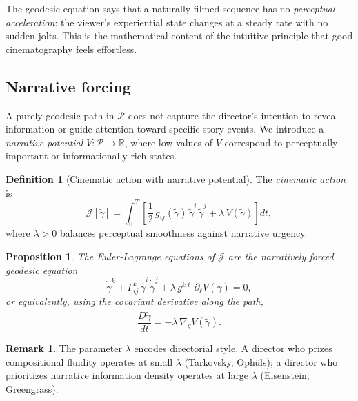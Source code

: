 \documentclass[12pt,a4paper]{article}
\theoremstyle{plain}
\newtheorem{proposition}[theorem]{Proposition}
\theoremstyle{definition}
\newtheorem{definition}[theorem]{Definition}
\newtheorem{remark}[theorem]{Remark}
\begin{document}
The geodesic equation says that a naturally filmed sequence has no
\emph{perceptual acceleration}: the viewer's experiential state changes at
a steady rate with no sudden jolts. This is the mathematical content of the
intuitive principle that good cinematography feels effortless.

\subsection{Narrative forcing}

A purely geodesic path in $\mathcal{P}$ does not capture the director's
intention to reveal information or guide attention toward specific story events.
We introduce a \emph{narrative potential} $V:\mathcal{P}\to\mathbb{R}$, where
low values of $V$ correspond to perceptually important or informationally rich
states.

\begin{definition}[Cinematic action with narrative potential]
The \emph{cinematic action} is
\[
\mathcal{J}[\tilde\gamma]
= \int_0^T
\!\left[
\frac{1}{2}\,g_{ij}(\tilde\gamma)\,\dot{\tilde\gamma}^i\,\dot{\tilde\gamma}^j
+ \lambda\,V(\tilde\gamma)
\right]dt,
\]
where $\lambda > 0$ balances perceptual smoothness against narrative urgency.
\end{definition}

\begin{proposition}
The Euler-Lagrange equations of $\mathcal{J}$ are the \emph{narratively forced
geodesic equation}
\[
\ddot{\tilde\gamma}^k
+ \Gamma^k_{ij}\,\dot{\tilde\gamma}^i\,\dot{\tilde\gamma}^j
+ \lambda\,g^{k\ell}\,\partial_\ell V(\tilde\gamma)
= 0,
\]
or equivalently, using the covariant derivative along the path,
\[
\frac{D\dot{\tilde\gamma}}{dt} = -\lambda\,\nabla_g V(\tilde\gamma).
\]
\end{proposition}

\begin{remark}
The parameter $\lambda$ encodes directorial style. A director who prizes
compositional fluidity operates at small $\lambda$ (Tarkovsky, Ophüls);
a director who prioritizes narrative information density operates at large
$\lambda$ (Eisenstein, Greengrass).
\end{remark}
\end{document}
